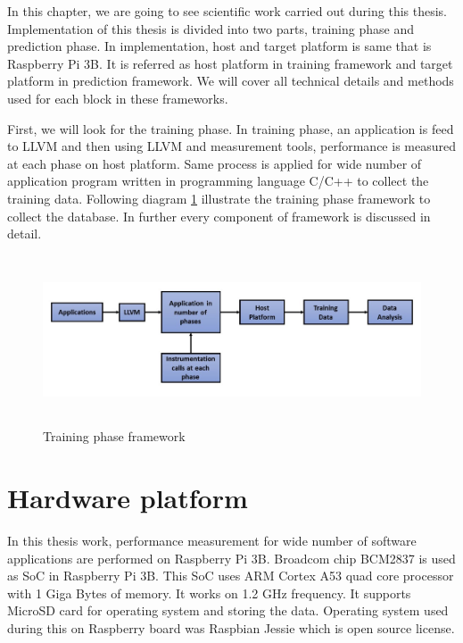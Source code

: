 \setlength{\parindent}{4em}
\setlength{\parskip}{1em}

In this chapter, we are going to see scientific work carried out during this thesis. Implementation of this thesis is divided into two parts, training phase and prediction phase. In implementation, host and target platform is same that is Raspberry Pi 3B. It is referred as host platform in training framework and target platform in prediction framework. We will cover all technical details and methods used for each block in these frameworks.

\par First, we will look for the training phase. In training phase, an application is  feed to LLVM and then using LLVM and measurement tools, performance is measured at each phase on host platform. Same process is applied for wide number of application program written in programming language C/C++ to collect the training data. Following diagram \ref{fig:training} illustrate the training phase framework to collect the database. In further every component of framework is discussed in detail.

\begin{figure}[h!]
\includegraphics[width=14cm, height=5cm]{./images/training}
\centering
\caption{Training phase framework}
\label{fig:training}
\end{figure}

\section{Hardware platform}
In this thesis work, performance measurement for wide number of software applications are performed on Raspberry Pi 3B. Broadcom chip BCM2837 is used as SoC in Raspberry Pi 3B. This SoC uses ARM Cortex A53 quad core processor with 1 Giga Bytes of memory. It works on 1.2 GHz frequency. It supports MicroSD card for operating system and storing the data. Operating system used during this on Raspberry board was Raspbian Jessie which is open source license.

